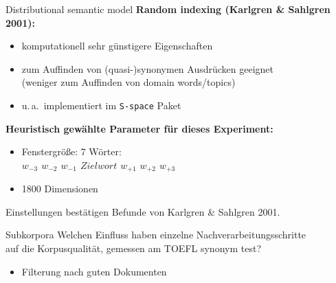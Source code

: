 \begin{frame}
	{Distributional semantic model}
	\textbf{Random indexing (Karlgren \& Sahlgren 2001):}
	  
	\begin{itemize}
	\item komputationell sehr günstigere Eigenschaften
	\item zum Auffinden von (quasi-)synonymen Ausdrücken geeignet\\
	  (weniger zum Auffinden von domain words/topics)
	\item u.\,a.\ implementiert im \texttt{S-space} Paket
	\end{itemize}
	
	\pause
	
	\textbf{Heuristisch gewählte Parameter für dieses Experiment:}
	
	\begin{itemize}
		\item Fenstergröße: 7 Wörter:\\
		 \textit{$w_{-3}$ $w_{-2}$ $w_{-1}$ $Zielwort$  $w_{+1}$ $w_{+2}$ $w_{+3}$}
		\item 1800 Dimensionen
	\end{itemize}
	
	Einstellungen bestätigen Befunde von Karlgren \& Sahlgren 2001.
\end{frame}


\begin{frame}
	{Subkorpora}
	Welchen Einfluss haben einzelne Nachverarbeitungsschritte\\
	auf die Korpusqualität, gemessen am TOEFL synonym test?
	
	\begin{itemize}
	\item Filterung nach guten Dokumenten
	\end{itemize}
	
	\end{frame}
	
